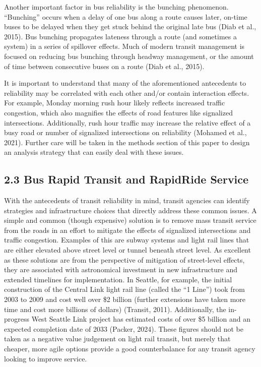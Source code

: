 \documentclass[
  12pt,
]{article}
\begin{document}
Another important factor in bus reliability is the bunching phenomenon.
``Bunching'' occurs when a delay of one bus along a route causes later,
on-time buses to be delayed when they get stuck behind the original late
bus (Diab et al., 2015). Bus bunching propagates lateness through a
route (and sometimes a system) in a series of spillover effects. Much of
modern transit management is focused on reducing bus bunching through
headway management, or the amount of time between consecutive buses on a
route (Diab et al., 2015).

It is important to understand that many of the aforementioned
antecedents to reliability may be correlated with each other and/or
contain interaction effects. For example, Monday morning rush hour
likely reflects increased traffic congestion, which also magnifies the
effects of road features like signalized intersections. Additionally,
rush hour traffic may increase the relative effect of a busy road or
number of signalized intersections on reliability (Mohamed et al.,
2021). Further care will be taken in the methods section of this paper
to design an analysis strategy that can easily deal with these issues.

\subsection{2.3 Bus Rapid Transit and RapidRide
Service}\label{bus-rapid-transit-and-rapidride-service}

With the antecedents of transit reliability in mind, transit agencies
can identify strategies and infrastructure choices that directly address
these common issues. A simple and common (though expensive) solution is
to remove mass transit service from the roads in an effort to mitigate
the effects of signalized intersections and traffic congestion. Examples
of this are subway systems and light rail lines that are either elevated
above street level or tunnel beneath street level. As excellent as these
solutions are from the perspective of mitigation of street-level
effects, they are associated with astronomical investment in new
infrastructure and extended timelines for implementation. In Seattle,
for example, the initial construction of the Central Link light rail
line (called the ``1 Line'') took from 2003 to 2009 and cost well over
\$2 billion (further extensions have taken more time and cost more
billions of dollars) (Transit, 2011). Additionally, the in-progress West
Seattle Link project has estimated costs of over \$5 billion and an
expected completion date of 2033 (Packer, 2024). These figures should
not be taken as a negative value judgement on light rail transit, but
merely that cheaper, more agile options provide a good counterbalance
for any transit agency looking to improve service.
\end{document}
